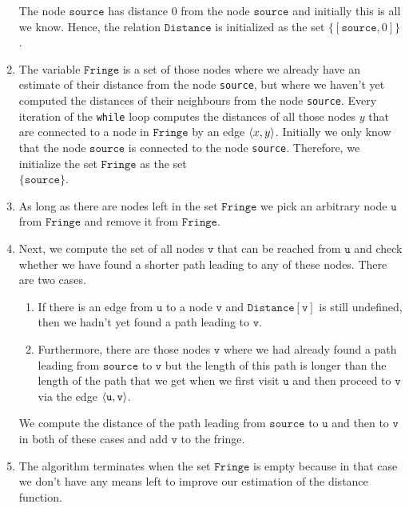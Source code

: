\begin{enumerate}
      The node $\texttt{source}$ has distance $0$ from the node $\texttt{source}$ and initially this is
      all we know.  Hence, the relation $\texttt{Distance}$ is initialized as the set $\bigl\{[\texttt{source},0]\bigr\}$.
\item The variable $\texttt{Fringe}$ is a set of those nodes where we already have an estimate of
      their distance from the  node \texttt{source}, but where we haven't yet computed the distances of their
      neighbours from the node \texttt{source}. 
      Every iteration of the \texttt{while} loop computes the distances of all those nodes $y$ that are
      connected to a node in $\texttt{Fringe}$ by an edge $\pair(x,y)$.
      Initially we only know that the node $\texttt{source}$ is connected to the node \texttt{source}.
      Therefore, we initialize the set $\texttt{Fringe}$ as the set
      \\[0.2cm]
      \hspace*{1.3cm}
      $\{ \texttt{source} \}$.
\item As long as there are nodes left in the set $\texttt{Fringe}$ we pick an arbitrary node
      $\texttt{u}$ from $\texttt{Fringe}$ and remove it from $\texttt{Fringe}$. 
\item Next, we compute the set of all nodes $\texttt{v}$ that can be reached from $\texttt{u}$ and check whether we
      have found a shorter path leading to any of these nodes.  There are two cases.
      \begin{enumerate}
      \item If there is an edge from $\texttt{u}$ to a node $\texttt{v}$ and  $\texttt{Distance}[\texttt{v}]$ is still
            undefined, then we hadn't yet found a path leading to $\texttt{v}$.
      \item Furthermore, there are those nodes $\texttt{v}$ where we had already found a path leading from
            $\texttt{source}$ to $\texttt{v}$ but the length of this path is longer than the length of the path
            that we get when we first visit $\texttt{u}$ and then proceed to $\texttt{v}$ via the edge $\pair(\texttt{u},\texttt{v})$.
      \end{enumerate}
      We compute the distance of the path leading from $\texttt{source}$ to $\texttt{u}$ and then to
      $\texttt{v}$ in both of these cases and add $\texttt{v}$ to the fringe.
\item The algorithm terminates when the set $\texttt{Fringe}$ is empty because in that case we don't
      have any means left to improve our estimation of the distance function.
\end{enumerate}

